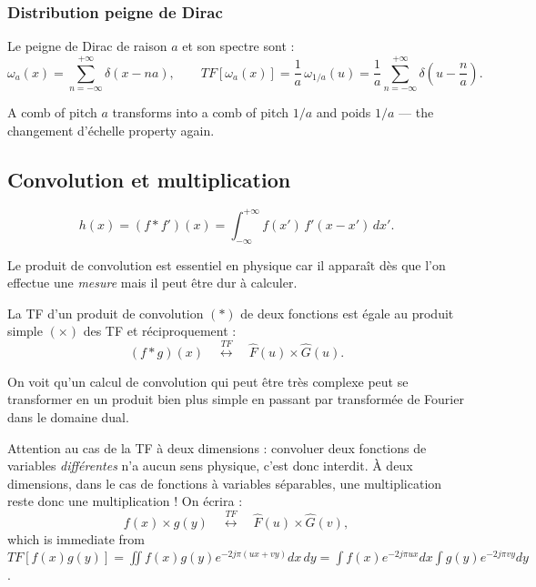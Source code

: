 \subsubsection{Distribution peigne de Dirac}
\begin{definition}
  Le peigne de Dirac de raison $a$ et son spectre sont :
  \[
    \omega_a(x) = \sum_{n=-\infty}^{+\infty} \delta(x - na),
    \qquad
    TF\!\left[\omega_a(x)\right] = \frac{1}{a}\,\omega_{1/a}(u)
      = \frac{1}{a}\sum_{n=-\infty}^{+\infty} \delta\!\left(u - \frac{n}{a}\right).
  \]
\end{definition}
A comb of pitch $a$ transforms into a comb of pitch $1/a$ and poids $1/a$ --- the
changement d'échelle property again.

\subsection{Convolution et multiplication}

\begin{definition}
  \[
    h(x) = (f * f')(x) = \int_{-\infty}^{+\infty} f(x')\, f'(x-x')\, dx' .
  \]
\end{definition}

Le produit de convolution est essentiel en physique car il apparaît dès que l'on
effectue une \emph{mesure} mais il peut être dur à calculer.

\begin{theorem}
  La TF d'un produit de convolution $(*)$ de deux fonctions est égale au produit
  simple $(\times)$ des TF et réciproquement :
  \[
    (f * g)(x)
    \quad\stackrel{TF}{\longleftrightarrow}\quad
    \hat{F}(u) \times \hat{G}(u).
  \]
\end{theorem}

On voit qu'un calcul de convolution qui peut être très complexe peut se
transformer en un produit bien plus simple en passant par transformée de Fourier
dans le domaine dual.

\begin{remark}
  Attention au cas de la TF à deux dimensions : convoluer deux fonctions de
  variables \emph{différentes} n'a aucun sens physique, c'est donc interdit. À
  deux dimensions, dans le cas de fonctions à variables séparables, une
  multiplication reste donc une multiplication ! On écrira :
  \[
    f(x) \times g(y)
    \quad\stackrel{TF}{\longleftrightarrow}\quad
    \hat{F}(u) \times \hat{G}(v),
  \]
  which is immediate from
  $TF[f(x)g(y)] = \iint f(x)g(y) e^{-2j\pi(ux+vy)}dx\,dy
   = \int f(x)e^{-2j\pi ux}dx \int g(y)e^{-2j\pi vy}dy$.
\end{remark}

